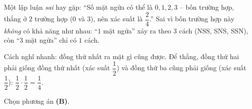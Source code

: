 {\begin{warnbox}Một lập luận \emph{sai} hay gặp: ``Số mặt ngửa có thể là $0,1,2,3$ -- bốn trường hợp, thắng ở $2$ trường hợp ($0$ và $3$), nên xác suất là $\dfrac24$.'' Sai vì bốn trường hợp này \emph{không} có khả năng như nhau: ``$1$ mặt ngửa'' xảy ra theo $3$ cách (NSS, SNS, SSN), còn ``$3$ mặt ngửa'' chỉ có $1$ cách.\end{warnbox}

\begin{tipbox}Cách nghĩ nhanh: đồng thứ nhất ra mặt gì cũng được. Để thắng, đồng thứ hai phải giống đồng thứ nhất (xác suất $\dfrac12$) và đồng thứ ba cũng phải giống (xác suất $\dfrac12$): $\dfrac12\cdot\dfrac12=\dfrac14$.\end{tipbox}

Chọn phương án \textbf{(B)}.
}


